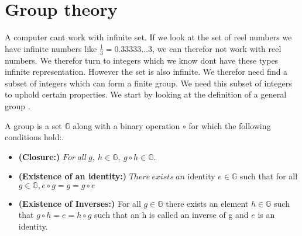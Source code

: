 
\section{Group theory} \label{sec:group_theory}
A computer cant work with infinite set. If we look at the set of reel numbers we have infinite numbers like $\frac{1}{3} = 0.33333...3$, we can therefor not work with reel numbers. We therefor turn to integers which we know dont have these types infinite representation. However the set is also infinite. We therefor need find a subset of integers which can form a finite group. We need this subset of integers to uphold certain properties. We start by looking at the definition of a general group \cite{Paar}.  

\begin{defi}
A \textnormal{group} is a set \begin{math}\mathbb{G}\end{math} along with a binary operation \begin{math}\circ \end{math} for which the following conditions hold:.
\begin{itemize}
\item \textnormal{\textbf{(Closure:)}}  \begin{math} For \ all \ g, \ h \in \mathbb{G},\ g \circ h \in \mathbb{G} \end{math}.
\item \textnormal{\textbf{(Existence of an identity:)}} \begin{math} There \ exists \ an \end{math} \textnormal{identity} \begin{math} e \in \mathbb{G} \end{math} such that for  all \begin{math} g \in \mathbb{G}, e \circ g = g =g \circ e \end{math}
\item \textnormal{\textbf{(Existence of Inverses:)}} For all \begin{math}g \in \mathbb{G}\end{math} there exists an element \begin{math}h \in \mathbb{G}\end{math} such that \begin{math}g \circ h = e =h \circ g \end{math} such that an h is called an \textnormal{inverse} of g and $e$ is an identity.

\end{itemize}
\end{defi}
